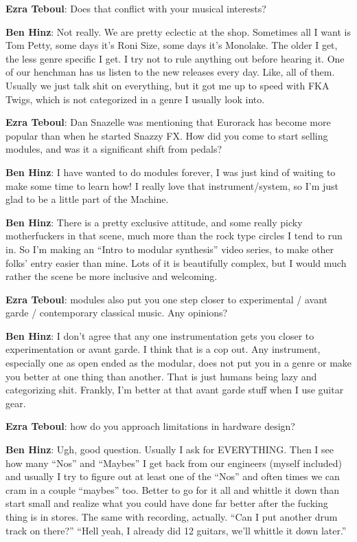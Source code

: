 \textbf{Ezra Teboul}: Does that conflict with your musical interests? 

\textbf{Ben Hinz}: Not really. We are pretty eclectic at the shop. Sometimes all I want is Tom 
Petty, some days it’s Roni Size, some days it's Monolake. The older I get, the 
less genre specific I get. I try not to rule anything out before hearing it. One of our 
henchman has us listen to the new releases every day. Like, all of them. Usually 
we just talk shit on everything, but it got me up to speed with FKA Twigs, which is 
not categorized in a genre I usually look into. 

\textbf{Ezra Teboul}: Dan Snazelle was mentioning that Eurorack has become more popular than
when he started Snazzy FX. How did you come to start selling modules,
and was it a significant shift from pedals? 

\textbf{Ben Hinz}: I have wanted to do modules forever, I was just kind of waiting to make 
some time to learn how! I really love that instrument/system, so I'm just glad to be 
a little part of the Machine. 

\textbf{Ben Hinz}: There is a pretty exclusive attitude, and some really picky motherfuckers in 
that scene, much more than the rock type circles I tend to run in. So I'm making 
an ``Intro to modular synthesis'' video series, to make other folks' entry easier 
than mine.  Lots of it is beautifully complex, but I would much rather the scene be 
more inclusive and welcoming.

\textbf{Ezra Teboul}: modules also put you one step closer to experimental / avant garde /
contemporary classical music. Any opinions? 

\textbf{Ben Hinz}: I don’t agree that any one instrumentation gets you closer to 
experimentation or avant garde.  I think that is a cop out.  Any instrument, 
especially one as open ended as the modular, does not put you in a genre or 
make you better at one thing than another. That is just humans being lazy and 
categorizing shit. Frankly, I'm better at that avant garde stuff when I use guitar 
gear.

\textbf{Ezra Teboul}: how do you approach limitations in hardware design? 

\textbf{Ben Hinz}: Ugh, good question. Usually I ask for EVERYTHING. Then I see how many 
``Nos'' and ``Maybes'' I get back from our engineers (myself included) and usually I
try to figure out at least one of the ``Nos'' and often times we can cram in a couple 
``maybes'' too. Better to go for it all and whittle it down than start small and realize 
what you could have done far better after the fucking thing is in stores. The same 
with recording, actually. ``Can I put another drum track on there?'' ``Hell yeah, I 
already did 12 guitars, we'll whittle it down later.''

